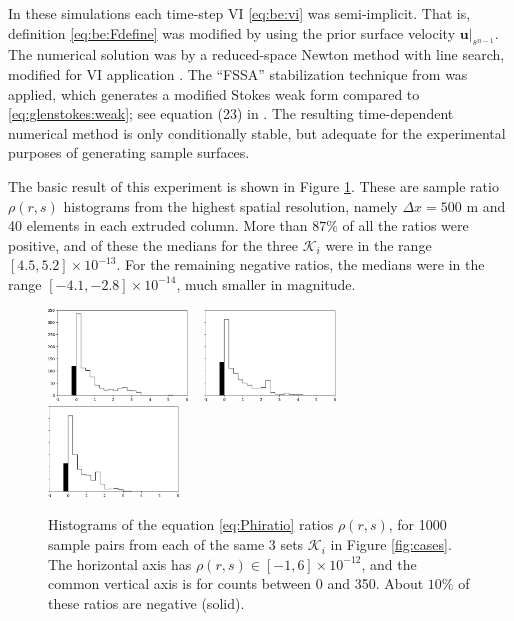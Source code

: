 \documentclass[hidelinks,onefignum,onetabnum,final]{siamart220329}  %
\newcommand{\bu}{\mathbf{u}}
\newcommand{\cK}{\mathcal{K}}
\begin{document}
In these simulations each time-step VI \eqref{eq:be:vi} was semi-implicit.  That is, definition \eqref{eq:be:Fdefine} was modified by using the prior surface velocity $\bu|_{s^{n-1}}$.  The numerical solution was by a reduced-space Newton method with line search, modified for VI application \cite{BensonMunson2006}.  The ``FSSA'' stabilization technique from \cite{LofgrenAhlkronaHelanow2022} was applied, which generates a modified Stokes weak form compared to \eqref{eq:glenstokes:weak}; see equation (23) in \cite{LofgrenAhlkronaHelanow2022}.  The resulting time-dependent numerical method is only conditionally stable, but adequate for the experimental purposes of generating sample surfaces.

The basic result of this experiment is shown in Figure \ref{fig:ratios}.  These are sample ratio $\rho(r,s)$ histograms from the highest spatial resolution, namely $\Delta x=500$ m and 40 elements in each extruded column.  More than $87\%$ of all the ratios were positive, and of these the medians for the three $\cK_i$ were in the range $[4.5,5.2] \times 10^{-13}$.  For the remaining negative ratios, the medians were in the range $[-4.1,-2.8]\times 10^{-14}$, much smaller in magnitude.

\begin{figure}[ht]
\mbox{\includegraphics[width=0.33\textwidth]{figs/flatratios.png} \, \includegraphics[width=0.31\textwidth]{figs/smoothratios.png} \, \includegraphics[width=0.31\textwidth]{figs/roughratios.png}}

\caption{Histograms of the equation \eqref{eq:Phiratio} ratios $\rho(r,s)$, for 1000 sample pairs from each of the same 3 sets $\cK_i$ in Figure \ref{fig:cases}.  The horizontal axis has  $\rho(r,s) \in [-1,6]\times 10^{-12}$, and the common vertical axis is for counts between 0 and 350.  About $10\%$ of these ratios are negative (solid).}
\label{fig:ratios}
\end{figure}
\end{document}
